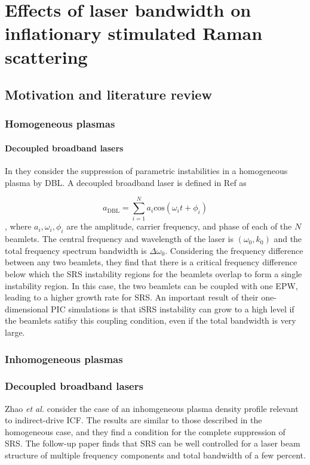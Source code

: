 \chapter{Effects of laser bandwidth on inflationary stimulated Raman scattering}
\label{chp:broadbandSRS}

\section{Motivation and literature review}

\subsection{Homogeneous plasmas}
\subsubsection{Decoupled broadband lasers}
In \cite{zhao_suppression_2019} they consider the suppression of parametric
instabilities in a homogeneous plasma by \acrfull{DBL}. A
decoupled broadband laser is defined in Ref \cite{zhao_effective_2017} as

\begin{equation}\label{eqn:DBL}
  a_{\mathrm{DBL}} = \sum_{i=1}^{N} a_i \mathrm{cos}(\omega_it + \phi_i)
\end{equation},
where $a_i,\omega_i,\phi_i$ are the amplitude, carrier frequency, and phase of
each of the $N$ beamlets. The central frequency and wavelength of the laser is
$(\omega_0,k_0)$ and the total frequency spectrum bandwidth is
$\Delta\omega_0$.
Considering the frequency difference between any two beamlets, they find that
there is a critical frequency difference below which the SRS instability regions
for the beamlets overlap to form a single instability region. In this case, the
two beamlets can be coupled with one EPW, leading to a higher growth rate for
SRS. An important result of their one-dimensional PIC simulations is that iSRS
instability can grow to a high level if the beamlets satifsy this coupling
condition, even if the total bandwidth is very large.

\subsection{Inhomogeneous plasmas}
\subsection{Decoupled broadband lasers}
Zhao \textit{et al.} \cite{zhao_effective_2017} consider the case of an
inhomgeneous plasma density profile relevant to indirect-drive ICF. The results
are similar to those described in the homogeneous case, and they find a
condition for the complete suppression of SRS. The follow-up paper
\cite{zhao_suppression_2019} finds that SRS can be well controlled for a laser
beam structure of multiple frequency components and total bandwidth of a few
percent.

